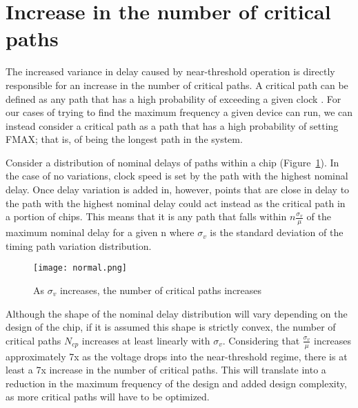 \section{Increase in the number of critical paths}
\label{sec:criticalpaths}

The increased variance in delay caused by near-threshold operation is directly responsible for an increase in the number of critical paths.
A critical path can be defined as any path that has a high probability of exceeding a given clock \cite{Wang:2004bw}.
For our cases of trying to find the maximum frequency a given device can run, we can instead consider a critical path as a path that has a high probability of setting FMAX; that is, of being the longest path in the system.
  
Consider a distribution of nominal delays of paths within a chip (Figure~\ref{fig:normal}).
In the case of no variations, clock speed is set by the path with the highest nominal delay.
Once delay variation is added in, however, points that are close in delay to the path with the highest nominal delay could act instead as the critical path in a portion of chips.
This means that it is any path that falls within $n\frac{\sigma_v}{\mu}$ of the maximum nominal delay for a given n where $\sigma_v$ is the standard deviation of the timing path variation distribution.
 
\begin{figure}[thpb]
    \centering
    \texttt{[image: normal.png]}
    \caption{As $\sigma_v$ increases, the number of critical paths increases}
    \label{fig:normal}
\end{figure}
 
 Although the shape of the nominal delay distribution will vary depending on the design of the chip, if it is assumed this shape is strictly convex, the number of critical paths $N_{cp}$ increases at least linearly with $\sigma_v$.
Considering that $\frac{\sigma_v}{\mu}$ increases approximately 7x as the voltage drops into the near-threshold regime, there is at least a 7x increase in the number of critical paths.
This will translate into a reduction in the maximum frequency of the design\cite{Bowman:2002cp} and added design complexity, as more critical paths will have to be optimized.

